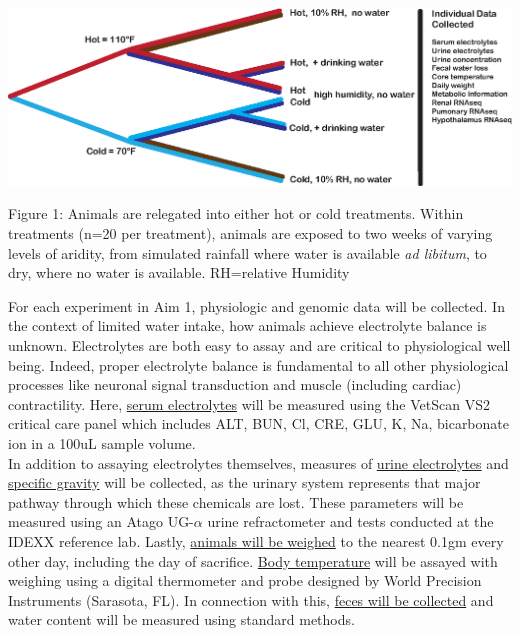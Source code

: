 \documentclass[11pt]{article}
\begin{document}
\vspace{2mm}

\begin{mdframed}
 \begin{center}
  \includegraphics[width=1\textwidth]{exp_design_fig.eps}
 \end{center} 

\noindent \small{Figure 1: Animals are relegated into either hot or cold treatments. Within treatments (n=20 per treatment), animals are exposed to two weeks of varying levels of aridity, from simulated rainfall where water is available \textit{ad libitum}, to dry, where no water is available. RH=relative Humidity}

\end{mdframed}

\vspace{5mm}


For each experiment in Aim 1, physiologic and genomic data will be collected. In the context of limited water intake, how animals achieve electrolyte balance is unknown. Electrolytes are both easy to assay and are critical to physiological well being. Indeed, proper electrolyte balance is fundamental to all other physiological processes like neuronal signal transduction and muscle (including cardiac) contractility. Here, \ul{serum electrolytes} will be measured using the VetScan VS2 critical care panel which includes ALT, BUN, Cl, CRE, GLU, K, Na, bicarbonate ion in a 100uL sample volume. \\

In addition to assaying electrolytes themselves, measures of \ul{urine electrolytes} and \ul{specific gravity} will be collected, as the urinary system represents that major pathway through which these chemicals are lost. These parameters will be measured using an Atago UG-$\alpha$ urine refractometer and tests conducted at the IDEXX reference lab. Lastly, \ul{animals will be weighed} to the nearest 0.1gm every other day, including the day of sacrifice. \ul{Body temperature} will be assayed with weighing using a digital thermometer and probe designed by World Precision Instruments (Sarasota, FL). In connection with this, \ul{feces will be collected} and water content will be measured using standard methods. \\
\end{document}
